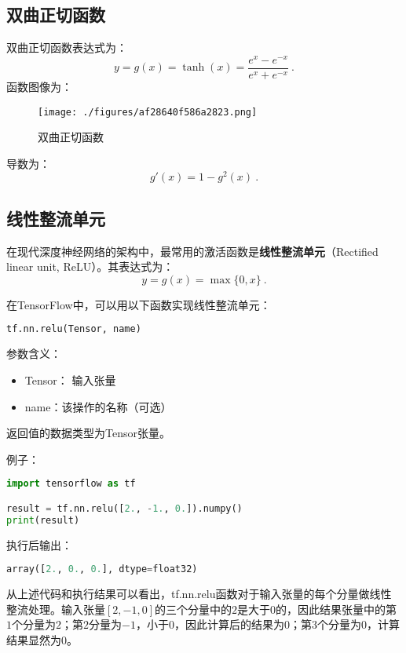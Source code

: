 \subsection{双曲正切函数}
双曲正切函数表达式为：
\begin{equation}
y=g(x)=\tanh(x)=\frac{e^x-e^{-x}}{e^x+e^{-x}}~.
\end{equation}
函数图像为：
\begin{figure}[ht]
\centering
\texttt{[image: ./figures/af28640f586a2823.png]}
\caption{双曲正切函数} \label{fig_ActFun3}
\end{figure}
导数为：
\begin{equation}
g'(x)=1-g^2(x)~.
\end{equation}

\subsection{线性整流单元}
在现代深度神经网络的架构中，最常用的激活函数是\textbf{线性整流单元}（Rectified linear unit, ReLU）。其表达式为：
\begin{equation}
y=g(x)=\max\{0,x\}~.
\end{equation}

在TensorFlow中，可以用以下函数实现线性整流单元：
\begin{lstlisting}[language=python]
tf.nn.relu(Tensor, name)
\end{lstlisting}

参数含义：
\begin{itemize}
\item Tensor： 输入张量
\item name：该操作的名称（可选）
\end{itemize}
返回值的数据类型为Tensor张量。

例子：
\begin{lstlisting}[language=python]
import tensorflow as tf

result = tf.nn.relu([2., -1., 0.]).numpy()
print(result)
\end{lstlisting}
执行后输出：
\begin{lstlisting}[language=python]
array([2., 0., 0.], dtype=float32)
\end{lstlisting}

从上述代码和执行结果可以看出，tf.nn.relu函数对于输入张量的每个分量做线性整流处理。输入张量$[2, -1, 0]$的三个分量中的$2$是大于$0$的，因此结果张量中的第$1$个分量为$2$；第$2$分量为$-1$，小于$0$，因此计算后的结果为$0$；第$3$个分量为$0$，计算结果显然为$0$。
